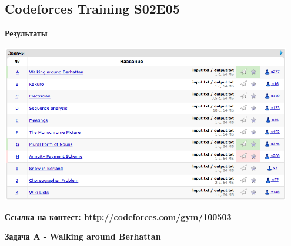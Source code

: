 \documentclass[a4paper,12pt]{article}
\begin{document}
%
%

\newpage
\subsection{Codeforces Training S02E05}

\textbf{{\large Результаты}} \\
\begin{center}
\includegraphics[width=0.95\textwidth]{CT_S02E05/CT_S02E05_result.png}\\ [1cm]
\end{center}

\textbf{{\large Ссылка на контест: \url{http://codeforces.com/gym/100503}}}

\newpage
\textbf{{\large Задача A - Walking around Berhattan}}
\end{document}
